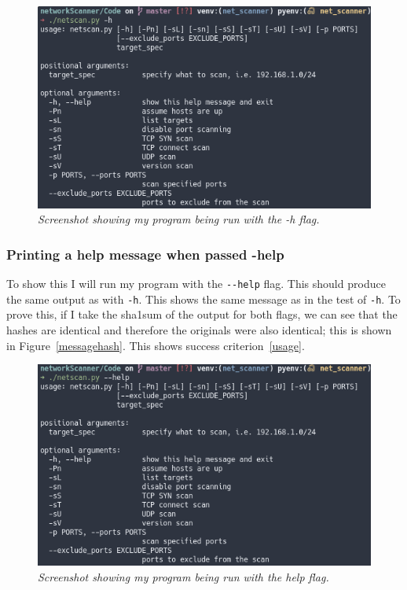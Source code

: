 \documentclass[titlepage]{article}
\let\Oldsubsubsection\subsubsection{}
\renewcommand{\subsubsection}{\FloatBarrier\Oldsubsubsection}
\begin{document}
\begin{figure}[H]
  \centering
  \includegraphics[width=\textwidth]{hmessage.png}
  \caption{\textit{%
    Screenshot showing my program being run with the -h flag.
}}\label{hflagtest}
\end{figure}

\subsubsection{Printing a help message when passed -help}\label{test:helpmessage}
To show this I will run my program with the \verb|--help| flag.
This should produce the same output as with \verb|-h|.
This shows the same message as in the test of \verb|-h|.
To prove this,
if I take the sha1sum of the output for both flags,
we can see that the hashes are identical and therefore the originals were also identical;
this is shown in Figure~\ref{messagehash}.
This shows success criterion~\ref{usage}.

\begin{figure}[H]
  \centering
  \includegraphics[width=\textwidth]{helpmessage.png}
  \caption{\textit{%
    Screenshot showing my program being run with the help flag.
}}\label{helpflagtest}
\end{figure}
\end{document}
